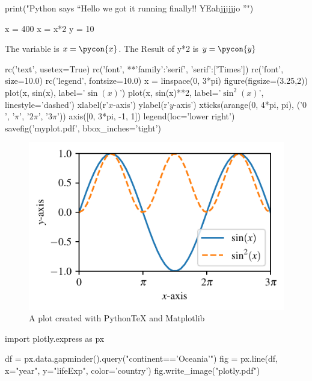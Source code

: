 
\begin{pycode}


print("Python says ``Hello we got it running finally!! YEahjjjjjjo ''")

\end{pycode}
\begin{pyconsole}
x = 400
x = x*2
y = 10
\end{pyconsole}
The variable is $x=\pycon{x}$. 
The Result of y*2 is $y=\pycon{y}$


\begin{pylabcode}[plotsession]
rc('text', usetex=True)
rc('font', **{'family':'serif', 'serif':['Times']})
rc('font', size=10.0)			
rc('legend', fontsize=10.0)
x = linspace(0, 3*pi)
figure(figsize=(3.25,2))
plot(x, sin(x), label='$\sin(x)$')
plot(x, sin(x)**2, label='$\sin^2(x)$',
linestyle='dashed')
xlabel(r'$x$-axis')
ylabel(r'$y$-axis')
xticks(arange(0, 4*pi, pi), ('$0$',
'$\pi$', '$2\pi$', '$3\pi$'))
axis([0, 3*pi, -1, 1])
legend(loc='lower right')
savefig('myplot.pdf', bbox_inches='tight')
\end{pylabcode}

\begin{figure}[h!]
\includegraphics{myplot}
\caption{\label{fig:matplotlib} A plot created with PythonTeX and Matplotlib}
\end{figure}

\begin{pylabcode}
import plotly.express as px

df = px.data.gapminder().query("continent=='Oceania'")
fig = px.line(df, x="year", y="lifeExp", color='country')
fig.write_image("plotly.pdf")
\end{pylabcode}
	
